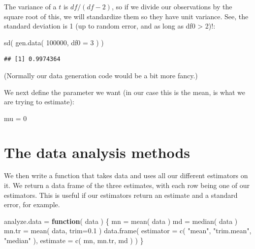 \documentclass[
]{book}
\newenvironment{Shaded}{\begin{snugshade}}{\end{snugshade}}
\newcommand{\AttributeTok}[1]{\textcolor[rgb]{0.77,0.63,0.00}{#1}}
\newcommand{\ControlFlowTok}[1]{\textcolor[rgb]{0.13,0.29,0.53}{\textbf{#1}}}
\newcommand{\DecValTok}[1]{\textcolor[rgb]{0.00,0.00,0.81}{#1}}
\newcommand{\FloatTok}[1]{\textcolor[rgb]{0.00,0.00,0.81}{#1}}
\newcommand{\FunctionTok}[1]{\textcolor[rgb]{0.00,0.00,0.00}{#1}}
\newcommand{\NormalTok}[1]{#1}
\newcommand{\OtherTok}[1]{\textcolor[rgb]{0.56,0.35,0.01}{#1}}
\newcommand{\StringTok}[1]{\textcolor[rgb]{0.31,0.60,0.02}{#1}}
\begin{document}
The variance of a \(t\) is \(df/(df-2)\), so if we divide our observations by the
square root of this, we will standardize them so they have unit variance.
See, the standard deviation is 1 (up to random error, and as long as df0 \textgreater{}
2)!:

\begin{Shaded}
\begin{Highlighting}[]
\FunctionTok{sd}\NormalTok{( }\FunctionTok{gen.data}\NormalTok{( }\DecValTok{100000}\NormalTok{, }\AttributeTok{df0 =} \DecValTok{3}\NormalTok{ ) )}
\end{Highlighting}
\end{Shaded}

\begin{verbatim}
## [1] 0.9974364
\end{verbatim}

(Normally our data generation code would be a bit more fancy.)

We next define the parameter we want (in our case this is the mean, is what
we are trying to estimate):

\begin{Shaded}
\begin{Highlighting}[]
\NormalTok{mu }\OtherTok{=} \DecValTok{0}
\end{Highlighting}
\end{Shaded}

\hypertarget{the-data-analysis-methods}{%
\section{The data analysis methods}\label{the-data-analysis-methods}}

We then write a function that takes data and uses all our different
estimators on it. We return a data frame of the three estimates, with each
row being one of our estimators. This is useful if our estimators return an
estimate and a standard error, for example.

\begin{Shaded}
\begin{Highlighting}[]
\NormalTok{analyze.data }\OtherTok{=} \ControlFlowTok{function}\NormalTok{( data ) \{}
\NormalTok{    mn }\OtherTok{=} \FunctionTok{mean}\NormalTok{( data )}
\NormalTok{    md }\OtherTok{=} \FunctionTok{median}\NormalTok{( data )}
\NormalTok{    mn.tr }\OtherTok{=} \FunctionTok{mean}\NormalTok{( data, }\AttributeTok{trim=}\FloatTok{0.1}\NormalTok{ )}
    \FunctionTok{data.frame}\NormalTok{( }\AttributeTok{estimator =} \FunctionTok{c}\NormalTok{( }\StringTok{"mean"}\NormalTok{, }\StringTok{"trim.mean"}\NormalTok{, }\StringTok{"median"}\NormalTok{ ),}
                \AttributeTok{estimate =} \FunctionTok{c}\NormalTok{( mn, mn.tr, md ) )}
\NormalTok{\}}
\end{Highlighting}
\end{Shaded}
\end{document}
